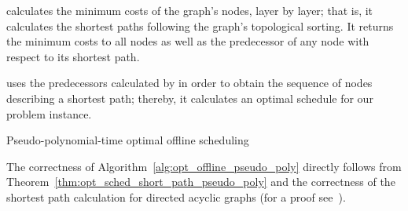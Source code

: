  calculates the minimum costs of the graph's nodes, layer by layer; that is, it calculates the shortest paths following the graph's topological sorting. It returns the minimum costs to all nodes as well as the predecessor of any node with respect to its shortest path.

 uses the predecessors calculated by  in order to obtain the sequence of nodes describing a shortest path; thereby, it calculates an optimal schedule for our problem instance.

\begin{algorithm}[ht]
  \caption{Pseudo-polynomial-time optimal offline scheduling}
  \begin{algorithmic}[1]
	  \State \Return{$\mx$}
  \EndFunction
  \Statex
	\Statex {}
	\EndFor
		\EndFor
	\EndFor
	\State {}
  \EndFunction
  \Statex
	\EndFor
	\State \Return{$\mx$}
  \EndFunction
  \end{algorithmic}
\label{alg:opt_offline_pseudo_poly}
\end{algorithm}
The correctness of Algorithm~\ref{alg:opt_offline_pseudo_poly} directly follows from Theorem~\ref{thm:opt_sched_short_path_pseudo_poly} and the correctness of the shortest path calculation for directed acyclic graphs (for a proof see~\parencite{intro-algo}).

